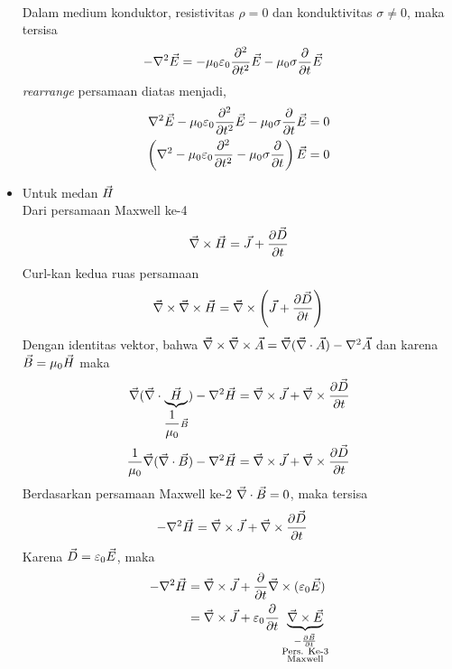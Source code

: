 \begin{itemize}
\begin{align*}
        \end{align*}
        Dalam medium konduktor, resistivitas $\rho=0$ dan konduktivitas $\sigma\neq 0$, maka tersisa
        \begin{align*}
            -\nabla^2\vec{E}&=-\mu_0\varepsilon_0 \frac{\partial^2 }{\partial t^2}\vec{E}-\mu_0\sigma \frac{\partial }{\partial t}\vec{E}
        \end{align*}
        \textit{rearrange} persamaan diatas menjadi,
        \begin{align*}
            \nabla^2\vec{E}-\mu_0\varepsilon_0 \frac{\partial^2 }{\partial t^2}\vec{E}-\mu_0\sigma \frac{\partial }{\partial t}\vec{E}&=0\\
            \left(\nabla^2-\mu_0\varepsilon_0 \frac{\partial^2 }{\partial t^2}-\mu_0\sigma \frac{\partial }{\partial t}\right)\vec{E}&=0
        \end{align*}
    \item Untuk medan $\vec{H}$\\
    Dari persamaan Maxwell ke-4
    \begin{align*}
        \vec{\nabla} \times \vec{H} = \vec{J}+\frac{\partial \vec{D}}{\partial t}
    \end{align*}
    Curl-kan kedua ruas persamaan
    \begin{align*}
        \vec{\nabla} \times\vec{\nabla} \times \vec{H} = \vec{\nabla} \times\left(\vec{J}+\frac{\partial \vec{D}}{\partial t}\right)
    \end{align*}
    Dengan identitas vektor, bahwa $\vec{\nabla} \times \vec{\nabla} \times \vec{A}=\vec{\nabla}(\vec{\nabla}\cdot\vec{A})-\nabla^2 \vec{A}$ dan karena $\vec{B} = \mu_0 \vec{H}$ maka
    \begin{align*}
        \vec{\nabla}(\vec{\nabla}\cdot\underbrace{\vec{H}}_{\dfrac{1}{\mu_0}\vec{B}})-\nabla^2\vec{H} &= \vec{\nabla} \times \vec{J}+\vec{\nabla} \times\frac{\partial \vec{D}}{\partial t}\\
        \frac{1}{\mu_0}\vec{\nabla}(\vec{\nabla}\cdot\vec{B})-\nabla^2\vec{H} &= \vec{\nabla} \times \vec{J}+\vec{\nabla} \times\frac{\partial \vec{D}}{\partial t}
    \end{align*}
    Berdasarkan persamaan Maxwell ke-2 $\vec{\nabla} \cdot \vec{B}=0$, maka tersisa
    \begin{align*}
        -\nabla^2\vec{H} &= \vec{\nabla} \times \vec{J}+\vec{\nabla} \times\frac{\partial \vec{D}}{\partial t}
    \end{align*}
    Karena $\vec{D}=\varepsilon_0 \vec{E}$, maka
    \begin{align*}
        -\nabla^2\vH &= \vnabla \times \vJ + \frac{\partial}{\partial t}\vnabla \times (\epsilon_0 \vE)\\
        &=\vnabla \times \vJ + \epsilon_0\frac{\partial}{\partial t}\underbrace{\vnabla \times \vE}_{\substack{-\frac{\partial \vB}{\partial t} \\ \text{Pers. Ke-3} \\\text{Maxwell}}}\\

\end{align*}
\end{itemize}
